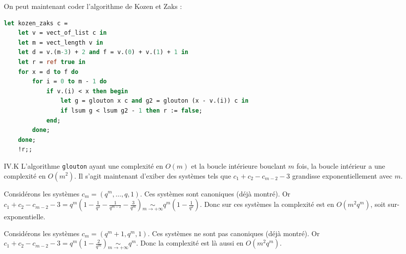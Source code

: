 \documentclass{article}
\begin{document}
\begin{enumerate}
        On peut maintenant coder l'algorithme de Kozen et Zaks :
        \begin{lstlisting}[language=Caml]
let kozen_zaks c =
    let v = vect_of_list c in
    let m = vect_length v in
    let d = v.(m-3) + 2 and f = v.(0) + v.(1) + 1 in
    let r = ref true in
    for x = d to f do
        for i = 0 to m - 1 do
            if v.(i) < x then begin
                let g = glouton x c and g2 = glouton (x - v.(i)) c in
                if lsum g < lsum g2 - 1 then r := false;
            end;
        done;
    done;
    !r;;
        \end{lstlisting}

    \item[IV.K] L'algorithme \texttt{glouton} ayant une complexité en $O(m)$ et la boucle intérieure bouclant $m$ fois, la boucle intérieur a une complexité en $O(m^2)$. Il s'agit maintenant d'exiber des systèmes tels que $c_1 + c_2 - c_{m-2} - 3$ grandisse exponentiellement avec $m$.

        Considérons les systèmes $c_m = (q^m, \ldots, q, 1)$. Ces systèmes sont canoniques (déjà montré). Or $c_1 + c_2 - c_{m-2} - 3 = q^m\left(1 - \frac{1}{q^2} - \frac{1}{q^{m-2}} - \frac{3}{q^m}\right) \underset{m\rightarrow +\infty}{\sim} q^m\left(1 - \frac{1}{q^2}\right)$. Donc sur ces systèmes la complexité est en $O(m^2q^m)$, soit sur-exponentielle.

        Considérons les systèmes $c_m = (q^m + 1, q^m, 1)$. Ces systèmes ne sont pas canoniques (déjà montré). Or $c_1 + c_2 - c_{m-2} - 3 = q^m\left(1 - \frac{2}{q^m}\right) \underset{m\rightarrow +\infty}{\sim} q^m$. Donc la complexité est là aussi en $O(m^2q^m)$.
\end{enumerate}
\end{document}
